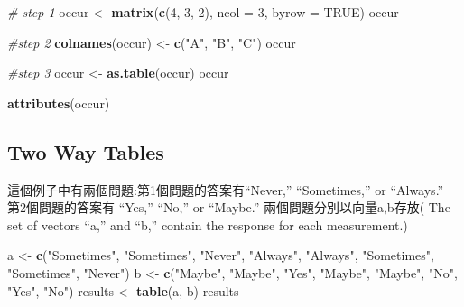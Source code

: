 \documentclass[]{book}
\newenvironment{Shaded}{\begin{snugshade}}{\end{snugshade}}
\newcommand{\KeywordTok}[1]{\textcolor[rgb]{0.13,0.29,0.53}{\textbf{#1}}}
\newcommand{\DataTypeTok}[1]{\textcolor[rgb]{0.13,0.29,0.53}{#1}}
\newcommand{\DecValTok}[1]{\textcolor[rgb]{0.00,0.00,0.81}{#1}}
\newcommand{\StringTok}[1]{\textcolor[rgb]{0.31,0.60,0.02}{#1}}
\newcommand{\CommentTok}[1]{\textcolor[rgb]{0.56,0.35,0.01}{\textit{#1}}}
\newcommand{\OtherTok}[1]{\textcolor[rgb]{0.56,0.35,0.01}{#1}}
\newcommand{\NormalTok}[1]{#1}
\theoremstyle{definition}
\theoremstyle{definition}
\theoremstyle{definition}
\theoremstyle{remark}
\begin{document}
\begin{Shaded}
\begin{Highlighting}[]
\CommentTok{# step 1}
\NormalTok{occur <-}\StringTok{ }\KeywordTok{matrix}\NormalTok{(}\KeywordTok{c}\NormalTok{(}\DecValTok{4}\NormalTok{, }\DecValTok{3}\NormalTok{, }\DecValTok{2}\NormalTok{), }\DataTypeTok{ncol =} \DecValTok{3}\NormalTok{, }\DataTypeTok{byrow =} \OtherTok{TRUE}\NormalTok{)}
\NormalTok{occur}
\end{Highlighting}
\end{Shaded}

\begin{Shaded}
\begin{Highlighting}[]
\CommentTok{#step 2}
\KeywordTok{colnames}\NormalTok{(occur) <-}\StringTok{ }\KeywordTok{c}\NormalTok{(}\StringTok{"A"}\NormalTok{, }\StringTok{"B"}\NormalTok{, }\StringTok{"C"}\NormalTok{)}
\NormalTok{occur}
\end{Highlighting}
\end{Shaded}

\begin{Shaded}
\begin{Highlighting}[]
\CommentTok{#step 3}
\NormalTok{occur <-}\StringTok{ }\KeywordTok{as.table}\NormalTok{(occur)}
\NormalTok{occur}
\end{Highlighting}
\end{Shaded}

\begin{Shaded}
\begin{Highlighting}[]
\KeywordTok{attributes}\NormalTok{(occur)}
\end{Highlighting}
\end{Shaded}

\subsection{Two Way Tables}\label{two-way-tables}

這個例子中有兩個問題:第1個問題的答案有``Never,'' ``Sometimes,'' or
``Always.''\\
第2個問題的答案有 ``Yes,'' ``No,'' or ``Maybe.''
兩個問題分別以向量a,b存放( The set of vectors ``a,'' and ``b,'' contain
the response for each measurement.)

\begin{Shaded}
\begin{Highlighting}[]
\NormalTok{a <-}\StringTok{ }\KeywordTok{c}\NormalTok{(}\StringTok{"Sometimes"}\NormalTok{, }\StringTok{"Sometimes"}\NormalTok{, }\StringTok{"Never"}\NormalTok{, }\StringTok{"Always"}\NormalTok{, }\StringTok{"Always"}\NormalTok{, }\StringTok{"Sometimes"}\NormalTok{, }\StringTok{"Sometimes"}\NormalTok{, }\StringTok{"Never"}\NormalTok{)}
\NormalTok{b <-}\StringTok{ }\KeywordTok{c}\NormalTok{(}\StringTok{"Maybe"}\NormalTok{, }\StringTok{"Maybe"}\NormalTok{, }\StringTok{"Yes"}\NormalTok{, }\StringTok{"Maybe"}\NormalTok{, }\StringTok{"Maybe"}\NormalTok{, }\StringTok{"No"}\NormalTok{, }\StringTok{"Yes"}\NormalTok{, }\StringTok{"No"}\NormalTok{)}
\NormalTok{results <-}\StringTok{ }\KeywordTok{table}\NormalTok{(a, b)}
\NormalTok{results}
\end{Highlighting}
\end{Shaded}
\end{document}
